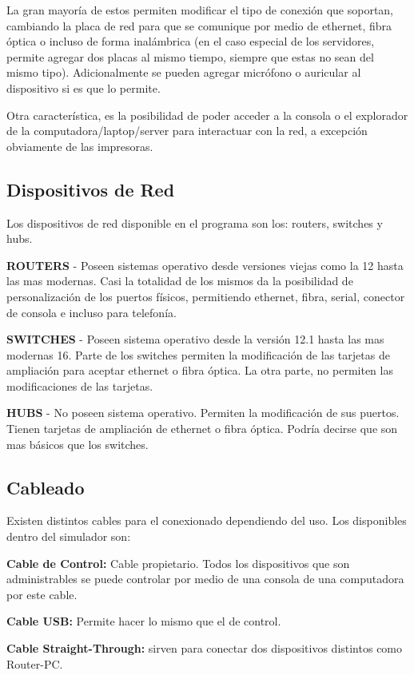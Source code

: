\documentclass{article}
\begin{document}
La gran mayoría de estos permiten modificar el tipo de conexión que soportan, cambiando la placa de red para que se comunique por medio de ethernet, fibra óptica o incluso de forma inalámbrica (en el caso especial de los servidores, permite agregar dos placas al mismo tiempo, siempre que estas no sean del mismo tipo). Adicionalmente se pueden agregar micrófono o auricular al dispositivo si es que lo permite. 

Otra característica, es la posibilidad de poder acceder a la consola o el explorador de la computadora/laptop/server para interactuar con la red, a excepción obviamente de las impresoras.

\subsection{Dispositivos de Red}

Los dispositivos de red disponible en el programa son los: routers, switches y hubs.

\textbf{ROUTERS} - Poseen sistemas operativo desde versiones viejas como la 12 hasta las mas modernas.  Casi la totalidad de los mismos da la posibilidad de personalización de los puertos físicos, permitiendo ethernet, fibra, serial, conector de consola e incluso para telefonía. 

\textbf{SWITCHES} - Poseen sistema operativo desde la versión 12.1 hasta las mas modernas 16. Parte de los switches permiten la modificación de las tarjetas de ampliación para aceptar ethernet o fibra óptica. La otra parte, no permiten las modificaciones de las tarjetas. 

\textbf{HUBS} - No poseen sistema operativo. Permiten la modificación de sus puertos. Tienen tarjetas de ampliación de ethernet o fibra óptica. Podría decirse que son mas básicos que los switches. 

\subsection{Cableado}
Existen distintos cables para el conexionado dependiendo del uso. Los disponibles dentro del simulador son: 

\textbf{Cable de Control:} Cable propietario. Todos los dispositivos que son administrables se puede controlar por medio de una consola de una computadora por este cable.

\textbf{Cable USB:} Permite hacer lo mismo que el de control. 

\textbf{Cable Straight-Through:} sirven para conectar dos dispositivos distintos como Router-PC.
\end{document}
